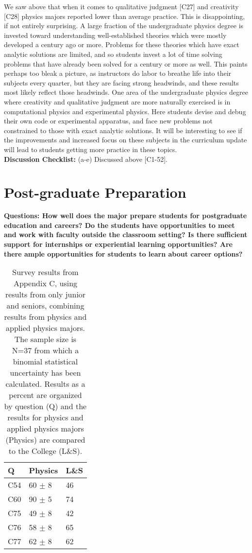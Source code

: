 \documentclass[12pt]{article}
\begin{document}
We saw above that when it comes to qualitative judgment [C27] and
creativity [C28] physics majors reported lower than average practice.
This is disappointing, if not entirely surprising.  A large fraction
of the undergraduate physics degree is invested toward understanding
well-established theories which were mostly developed a century ago or
more.  Problems for these theories which have exact analytic solutions
are limited, and so students invest a lot of time solving problems
that have already been solved for a century or more as well.  This
paints perhaps too bleak a picture, as instructors do labor to breathe
life into their subjects every quarter, but they are facing strong
headwinds, and these results most likely reflect those headwinds.  One
area of the undergraduate physics degree where creativity and
qualitative judgment are more naturally exercised is in computational
physics and experimental physics.  Here students devise and debug
their own code or experimental apparatus, and face new problems not
constrained to those with exact analytic solutions.  It will be
interesting to see if the improvements and increased focus on these
subjects in the curriculum update will lead to students getting more
practice in these topics.\\[3pt]

\noindent
{\bf Discussion Checklist:} (a-e) Discussed above [C1-52].

\newpage
\section{Post-graduate Preparation}
{\bf Questions: How well does the major prepare students for
  postgraduate education and careers?  Do the students have
  opportunities to meet and work with faculty outside the classroom
  setting? Is there sufficient support for internships or experiential
  learning opportunities?  Are there ample opportunities for students
  to learn about career options?}

\begin{table}[htbp]
\caption{\label{tbl:appcii} Survey results from Appendix C, using
  results from only junior and seniors, combining results from physics
  and applied physics majors. The sample size is N=37 from which a
  binomial statistical uncertainty has been calculated.  Results as a
  percent are organized by question (Q) and the results for physics
  and applied physics majors (Physics) are compared to the College
  (L\&S).}
\begin{center}
\begin{tabular}{|lll|}
\hline
Q & Physics & L\&S \\
\hline
C54 & 60 $\pm$ 8 & 46 \\ 
C60 & 90 $\pm$ 5 & 74 \\
C75 & 49 $\pm$ 8 & 42 \\ 
C76 & 58 $\pm$ 8 & 65 \\ 
C77 & 62 $\pm$ 8 & 62 \\ 
\hline 
\end{tabular}
\end{center}
\end{table}
\end{document}
